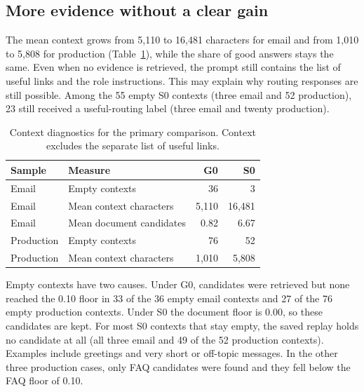 \subsection{More evidence without a clear gain}

The mean context grows from 5,110 to 16,481 characters for email and from 1,010 to 5,808 for production (Table~\ref{tab:context-diagnostics}), while the share of good answers stays the same. Even when no evidence is retrieved, the prompt still contains the list of useful links and the role instructions. This may explain why routing responses are still possible. Among the 55 empty S0 contexts (three email and 52 production), 23 still received a useful-routing label (three email and twenty production).

\begin{table}[htbp]
\centering
\caption[Context diagnostics for the primary comparison]{Context diagnostics for the primary comparison. Context excludes the separate list of useful links.}
\label{tab:context-diagnostics}
\begin{tabular}{llrr}
\toprule
Sample & Measure & G0 & S0 \\
\midrule
Email & Empty contexts & 36 & 3 \\
Email & Mean context characters & 5,110 & 16,481 \\
Email & Mean document candidates & 0.82 & 6.67 \\
Production & Empty contexts & 76 & 52 \\
Production & Mean context characters & 1,010 & 5,808 \\
\bottomrule
\end{tabular}
\end{table}

Empty contexts have two causes. Under G0, candidates were retrieved but none reached the 0.10 floor in 33 of the 36 empty email contexts and 27 of the 76 empty production contexts. Under S0 the document floor is 0.00, so these candidates are kept. For most S0 contexts that stay empty, the saved replay holds no candidate at all (all three email and 49 of the 52 production contexts). Examples include greetings and very short or off-topic messages. In the other three production cases, only FAQ candidates were found and they fell below the FAQ floor of 0.10.

